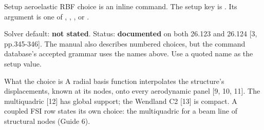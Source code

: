 \begin{frame}{Setup aeroelastic RBF choice}
\small {} is an inline
 command. The setup key is .
Its argument is one of , ,
,  or
.
\par\vspace{1mm}
\small Solver default: \textbf{not stated}. Status: \textbf{documented} on
both 26.123 and 26.124 [3, pp.345-346]. The manual also describes numbered
choices, but the command database's accepted grammar uses the names above.
Use a quoted name as the setup value.
\begin{block}{What the choice is}
\small A radial basis function interpolates the structure's displacements,
known at its nodes, onto every aerodynamic panel [9, 10, 11]. The
multiquadric [12] has global support; the Wendland C2 [13] is compact. A
coupled FSI row states its own choice: the multiquadric for a beam line of
structural nodes (Guide 6).
\end{block}
\end{frame}
